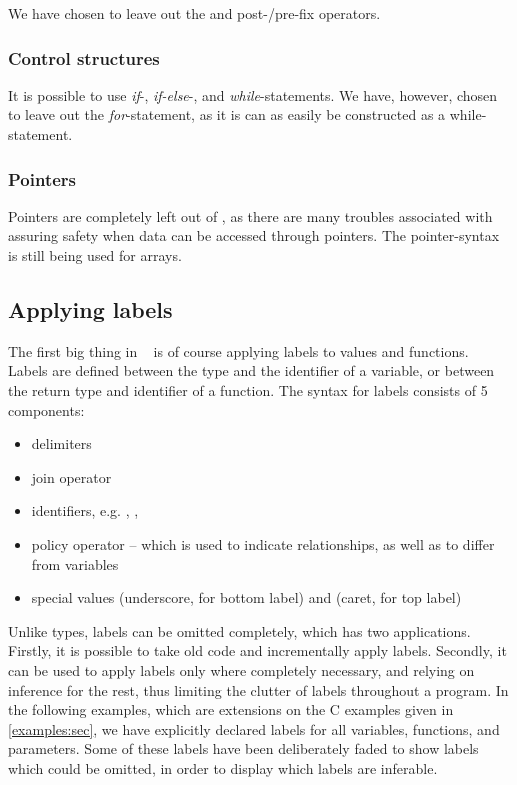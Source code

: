 We have chosen to leave out the \tk{++} and \tk{-{}-} post-/pre-fix operators.

\subsubsection{Control structures}
It is possible to use \emph{if}-, \emph{if-else}-, and \emph{while}-statements.
We have, however, chosen to leave out the \emph{for}-statement, as it is can as easily be constructed as a while-statement.

\subsubsection{Pointers}
Pointers are completely left out of \thelang, as there are many troubles associated with assuring safety when data can be accessed through pointers.
The pointer-syntax is still being used for arrays.

\subsection{Applying labels}
The first big thing in \thelang~ is of course applying labels to values and functions.
Labels are defined between the type and the identifier of a variable, or between the return type and identifier of a function.
The syntax for labels consists of 5 components:
\begin{itemize}
  \item delimiters \dlmc{\{\{ \}\}}
  \item join operator \dlmc{;}
  \item identifiers, e.g. , , 
  \item policy operator \dlmc{->} -- which is used to indicate  relationships, as well as to differ from variables
  \item special values \dlmc{_} (underscore, for bottom label) and \dlmc{^} (caret, for top label)
\end{itemize}

Unlike types, labels can be omitted completely, which has two applications.
Firstly, it is possible to take old code and incrementally apply labels.
Secondly, it can be used to apply labels only where completely necessary, and relying on inference for the rest, thus limiting the clutter of labels throughout a program.
In the following examples, which are extensions on the C examples given in \cref{examples:sec}, we have explicitly declared labels for all variables, functions, and parameters.
Some of these labels have been deliberately faded to show labels which could be omitted, in order to display which labels are inferable.


